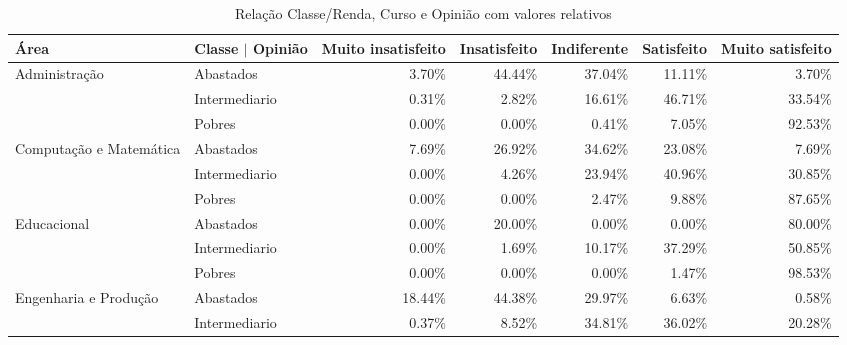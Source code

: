 \documentclass[10pt,a4paper,oneside]{article}
\begin{document}
\begin{table}[ht]
\scriptsize
\centering
\caption{Relação Classe/Renda, Curso e Opinião com valores relativos}
\label{tab:q20a2}
\begin{tabular}{ll rrrrr}
  \toprule
 Área                    & Classe $\vert$ Opinião & \multicolumn{1}{l}{ Muito insatisfeito} & \multicolumn{1}{l}{ Insatisfeito} & \multicolumn{1}{l}{ Indiferente} & \multicolumn{1}{l}{ Satisfeito} & 
\multicolumn{1}{l}{ Muito satisfeito} \\ 
   \midrule
  Administração           & Abastados               &               3.70\% &        44.44\% &       37.04\% &      11.11\% &             3.70\% \\ 
                          & Intermediario           &               0.31\% &         2.82\% &       16.61\% &      46.71\% &            33.54\% \\ 
                          & Pobres                  &               0.00\% &         0.00\% &        0.41\% &       7.05\% &            92.53\% \\ 
  Computação e Matemática & Abastados               &               7.69\% &        26.92\% &       34.62\% &      23.08\% &             7.69\% \\ 
                          & Intermediario           &               0.00\% &         4.26\% &       23.94\% &      40.96\% &            30.85\% \\ 
                          & Pobres                  &               0.00\% &         0.00\% &        2.47\% &       9.88\% &            87.65\% \\ 
  Educacional             & Abastados               &               0.00\% &        20.00\% &        0.00\% &       0.00\% &            80.00\% \\ 
                          & Intermediario           &               0.00\% &         1.69\% &       10.17\% &      37.29\% &            50.85\% \\ 
                          & Pobres                  &               0.00\% &         0.00\% &        0.00\% &       1.47\% &            98.53\% \\ 
  Engenharia e Produção   & Abastados               &              18.44\% &        44.38\% &       29.97\% &       6.63\% &             0.58\% \\ 
                          & Intermediario           &               0.37\% &         8.52\% &       34.81\% &      36.02\% &            20.28\% \\ 

\end{tabular}
\end{table}
\end{document}
